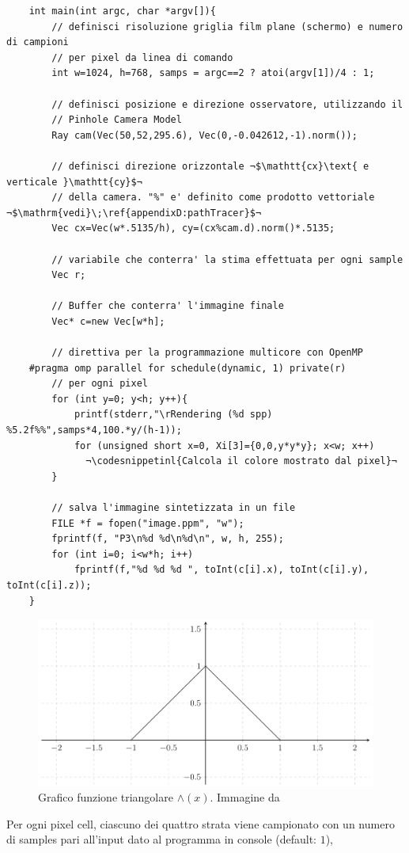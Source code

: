 \begin{verbatim}
	int main(int argc, char *argv[]){ 
		// definisci risoluzione griglia film plane (schermo) e numero di campioni
		// per pixel da linea di comando
		int w=1024, h=768, samps = argc==2 ? atoi(argv[1])/4 : 1; 

		// definisci posizione e direzione osservatore, utilizzando il 
		// Pinhole Camera Model
		Ray cam(Vec(50,52,295.6), Vec(0,-0.042612,-1).norm()); 

		// definisci direzione orizzontale ¬$\mathtt{cx}\text{ e verticale }\mathtt{cy}$¬
		// della camera. "%" e' definito come prodotto vettoriale ¬$\mathrm{vedi}\;\ref{appendixD:pathTracer}$¬
		Vec cx=Vec(w*.5135/h), cy=(cx%cam.d).norm()*.5135; 

		// variabile che conterra' la stima effettuata per ogni sample
		Vec r; 

		// Buffer che conterra' l'immagine finale
		Vec* c=new Vec[w*h]; 

		// direttiva per la programmazione multicore con OpenMP
	#pragma omp parallel for schedule(dynamic, 1) private(r)
		// per ogni pixel
		for (int y=0; y<h; y++){                       
			printf(stderr,"\rRendering (%d spp) %5.2f%%",samps*4,100.*y/(h-1)); 
			for (unsigned short x=0, Xi[3]={0,0,y*y*y}; x<w; x++)   
			  ¬\codesnippetinl{Calcola il colore mostrato dal pixel}¬
		} 

		// salva l'immagine sintetizzata in un file
		FILE *f = fopen("image.ppm", "w");         
		fprintf(f, "P3\n%d %d\n%d\n", w, h, 255); 
		for (int i=0; i<w*h; i++) 
			fprintf(f,"%d %d %d ", toInt(c[i].x), toInt(c[i].y), toInt(c[i].z)); 
	} 
\end{verbatim}
\begin{figure}[tb]
	\centering
	\includegraphics[width=0.6\linewidth]{../assets/chapter8_triangular_function.png}
	\caption{Grafico funzione triangolare $\wedge(x)$. Immagine da \cite{pegoraro}}
\end{figure}
Per ogni pixel cell, ciascuno dei quattro strata viene campionato con un numero di samples pari all'input dato al programma in console (default: $1$),
